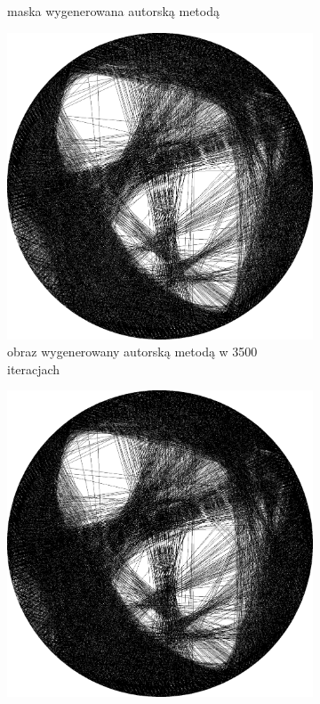 \begin{figure}[H]
\begin{subfigure}{0.23\textwidth}
            \caption{maska wygenerowana autorską metodą\\\hphantom{ }}
            \label{comp-comp-magdalene-h}
        \end{subfigure}
        \begin{subfigure}{0.23\textwidth}
            \centering
            \includegraphics[width = \textwidth]{img/6-comp/magdalene_e_i3500_c20_inv0_bg1_obj2_ed1.png}
            \caption{obraz wygenerowany autorską metodą w 3500 iteracjach}
            \label{comp-comp-magdalene-i}
        \end{subfigure}
        \begin{subfigure}{0.23\textwidth}
            \centering
            \includegraphics[width = \textwidth]{img/6-comp/magdalene_e_i4000_c20_inv0_bg1_obj2_ed1.png}

\end{subfigure}
\end{figure}
